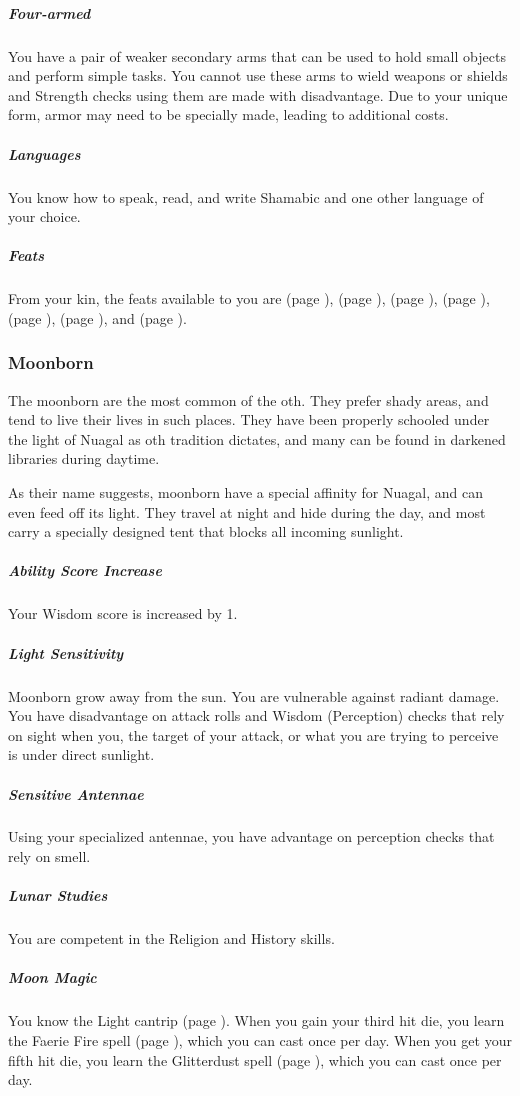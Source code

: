     \subparagraph{Four-armed} You have a pair of weaker secondary arms that can be used to hold small objects and perform simple tasks.
    You cannot use these arms to wield weapons or shields and Strength checks using them are made with disadvantage.
    Due to your unique form, armor may need to be specially made, leading to additional costs.

    \subparagraph{Languages} You know how to speak, read, and write Shamabic and one other language of your choice.

    \subparagraph{Feats} From your kin, the feats available to you are
    \textbf{} (page \pageref{feat::}),
    \textbf{} (page \pageref{feat::}),
    \textbf{} (page \pageref{feat::}),
    \textbf{} (page \pageref{feat::}),
    \textbf{} (page \pageref{feat::}),
    \textbf{} (page \pageref{feat::}), and
    \textbf{} (page \pageref{feat::}).

\subsubsection{Moonborn}
    The moonborn are the most common of the oth.
    They prefer shady areas, and tend to live their lives in such places.
    They have been properly schooled under the light of Nuagal as oth tradition dictates, and many can be found in darkened libraries during daytime.

    As their name suggests, moonborn have a special affinity for Nuagal, and can even feed off its light.
    They travel at night and hide during the day, and most carry a specially designed tent that blocks all incoming sunlight.

    \subparagraph{Ability Score Increase} Your Wisdom score is increased by 1.

    \subparagraph{Light Sensitivity} Moonborn grow away from the sun.
    You are vulnerable against radiant damage.
    You have disadvantage on attack rolls and Wisdom (Perception) checks that rely on sight when you, the target of your attack, or what you are trying to perceive is under direct sunlight.

    \subparagraph{Sensitive Antennae} Using your specialized antennae, you have advantage on perception checks that rely on smell.

    \subparagraph{Lunar Studies} You are competent in the Religion and History skills.

    \subparagraph{Moon Magic} You know the Light cantrip (page \pageref{spell::light}).
    When you gain your third hit die, you learn the Faerie Fire spell (page \pageref{spell::faeriefire}), which you can cast once per day.
    When you get your fifth hit die, you learn the Glitterdust spell (page \pageref{spell::glitterdust}), which you can cast once per day.

